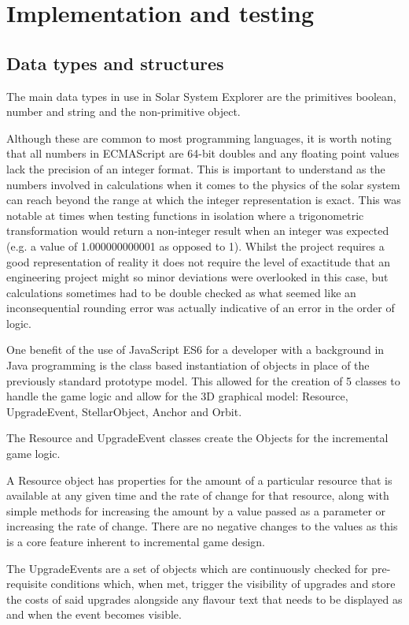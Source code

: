\documentclass[twoside]{bhamthesis}
\begin{document}
\section{Implementation and testing}

\subsection{Data types and structures}
The main data types in use in Solar System Explorer are the primitives boolean, number and string and the non-primitive object.

Although these are common to most programming languages, it is worth noting that all numbers in ECMAScript are 64-bit doubles and any floating point values lack the precision of an integer format. This is important to understand as the numbers involved in calculations when it comes to the physics of the solar system can reach beyond the range at which the integer representation is exact. This was notable at times when testing functions in isolation where a trigonometric transformation would return a non-integer result when an integer was expected (e.g. a value of 1.000000000001 as opposed to 1).  Whilst the project requires a good representation of reality it does not require the level of exactitude that an engineering project might so minor deviations were overlooked in this case, but calculations sometimes had to be double checked as what seemed like an inconsequential rounding error was actually  indicative of an error in the order of logic.

One benefit of the use of JavaScript ES6 for a developer with a background in Java programming is the class based instantiation of objects in place of the previously standard prototype model. This allowed for the creation of 5 classes to handle the game logic and allow for the 3D graphical model: Resource, UpgradeEvent, StellarObject, Anchor and Orbit.

The Resource and UpgradeEvent classes create the Objects for the incremental game logic.

A Resource object has properties for the amount of a particular resource that is available at any given time and the rate of change for that resource, along with simple methods for increasing the amount by a value passed as a parameter or increasing the rate of change. There are no negative changes to the values as this is a core feature inherent to incremental game design.

The UpgradeEvents are a set of objects which are continuously checked for pre-requisite conditions which, when met, trigger the visibility of upgrades and store the costs of said upgrades alongside any flavour text that needs to be displayed as and when the event becomes visible.
\end{document}
